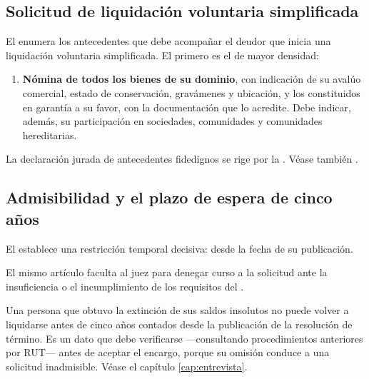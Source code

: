 \subsection{Solicitud de liquidación voluntaria simplificada}

El  enumera los antecedentes que debe acompañar el deudor que inicia una
liquidación voluntaria simplificada. El primero es el de mayor densidad:

\begin{enumerate}
  \item \textbf{Nómina de todos los bienes de su dominio}, con indicación de su avalúo
  comercial, estado de conservación, gravámenes y ubicación,  y los constituidos en garantía a su
  favor, con la documentación que lo acredite. Debe indicar, además, su participación en
  sociedades, comunidades y comunidades hereditarias.
\end{enumerate}


La declaración jurada de antecedentes fidedignos se rige por la 
\citeyearpar{ncg-22}. Véase también \textcite{superir-faq-liquidacion-simplificada}.

\subsection{Admisibilidad y el plazo de espera de cinco años}

El  establece una restricción temporal decisiva: 
desde la fecha de su publicación.

El mismo artículo faculta al juez para denegar curso a la solicitud ante la insuficiencia o
el incumplimiento de los requisitos del .

\begin{alerta}
Una persona que obtuvo la extinción de sus saldos insolutos no puede volver a liquidarse
antes de cinco años contados desde la publicación de la resolución de término. Es un dato
que debe verificarse ---consultando procedimientos anteriores por RUT--- antes de aceptar el
encargo, porque su omisión conduce a una solicitud inadmisible. Véase el capítulo
\ref{cap:entrevista}.
\end{alerta}

